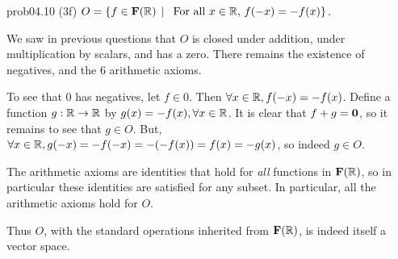 \begin{sol}{prob04.10}
(3f) $O=\{f \in \mathbf{F}(\mathbb{R}) \,\mid \, \text{ For all } x\in \mathbb{R},   \, f(-x)= -f(x) \}$.  

\soln We saw in previous questions that $O$ is closed under addition, under multiplication by scalars, and has a zero. There remains the existence of negatives, and  the 6 arithmetic axioms.
 
To see that $0$ has negatives, let $f\in 0$. Then $\forall x\in \mathbb{R}, f(-x)= -f(x)$. Define a function $g: \mathbb{R} \to \mathbb{R}$ by $g(x)=-f(x), \forall x\in \mathbb{R}$. It is clear that $f+g={\bf 0}$, so it remains to see that $g\in O$. But, $\forall x\in \mathbb{R}, g(-x)= -f(-x)=-(-f(x))=f(x)=-g(x)$, so indeed $g\in O$. 

The arithmetic axioms are identities that hold for {\it all} functions in $\mathbf{F}(\mathbb{R})$, so in particular these identities are satisfied for any subset. In particular, all the arithmetic axioms hold for $O$.

Thus $O$, with the standard operations inherited from $\mathbf{F}(\mathbb{R})$, is indeed itself a vector space.



\end{sol} 


